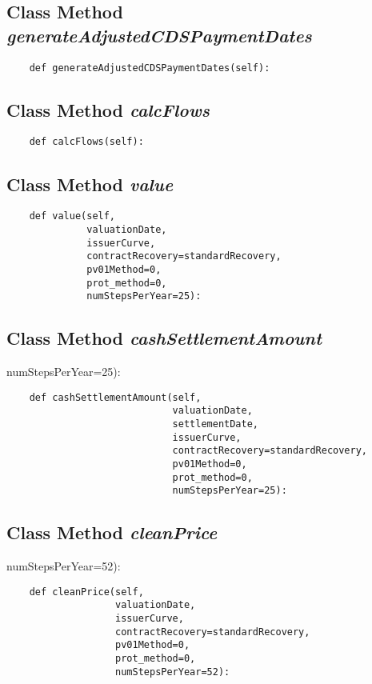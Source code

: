 \documentclass[twoside,11pt]{book}
\begin{document}
\subsection{Class Method {\it generateAdjustedCDSPaymentDates}}


\begin{lstlisting}
    def generateAdjustedCDSPaymentDates(self):
\end{lstlisting}

\subsection{Class Method {\it calcFlows}}


\begin{lstlisting}
    def calcFlows(self):
\end{lstlisting}

\subsection{Class Method {\it value}}


\begin{lstlisting}
    def value(self,
              valuationDate,
              issuerCurve,
              contractRecovery=standardRecovery,
              pv01Method=0,
              prot_method=0,
              numStepsPerYear=25):
\end{lstlisting}

\subsection{Class Method {\it cashSettlementAmount}}
numStepsPerYear=25):

\begin{lstlisting}
    def cashSettlementAmount(self,
                             valuationDate,
                             settlementDate,
                             issuerCurve,
                             contractRecovery=standardRecovery,
                             pv01Method=0,
                             prot_method=0,
                             numStepsPerYear=25):
\end{lstlisting}

\subsection{Class Method {\it cleanPrice}}
numStepsPerYear=52):

\begin{lstlisting}
    def cleanPrice(self,
                   valuationDate,
                   issuerCurve,
                   contractRecovery=standardRecovery,
                   pv01Method=0,
                   prot_method=0,
                   numStepsPerYear=52):
\end{lstlisting}
\end{document}

